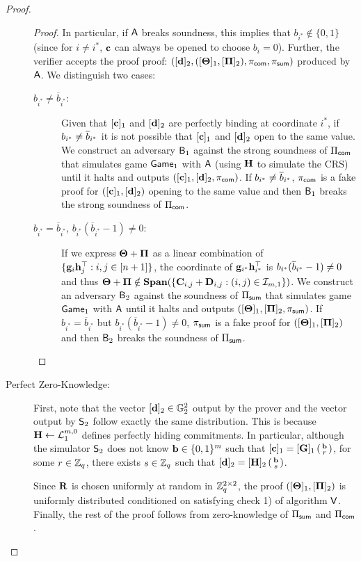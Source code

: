 \begin{proof}
\begin{description}
\begin{proof}
In particular, if $\mathsf{A}$ breaks soundness, this implies that $b_{i^*} \notin \{0,1\}$ (since for $i\neq i^*$, 
$\mathbf{c}$ can always be opened to 
  choose $b_i=0$). Further, the verifier accepts the proof proof:
$ (
        [\mathbf{d}]_2,
        ([\mathbf{{\Theta}}]_1, [\mathbf{{\Pi}}]_2), 
        \pi_{\mathsf{com}},\pi_{\mathsf{sum}} )$
  produced by $\mathsf{A}$.
We distinguish two cases:
\begin{description}
\item[$b_{i^*} \neq \overline{b}_{i^*}$:] Given that $[\mathbf{c}]_1$ and $[\mathbf{d}]_2$ are perfectly binding at coordinate $i^*$, if $b_{i^*}\neq\overline{b}_{i^*}$ it is not possible that $[\mathbf{c}]_1$ and $[\mathbf{d}]_2$ open to the same value. We construct an adversary $\mathsf{B}_1$ against the strong soundness 
of $\Pi_{\mathsf{com}}$ that simulates game $\mathsf{Game}_1$ with $\mathsf{A}$ (using $\mathbf{{H}}$ to simulate the CRS) until it halts and outputs $([\mathbf{c}]_1,[\mathbf{d}]_2,\pi_{\mathsf{com}})$. If $b_{i^*}\neq\overline{b}_{i^*}$, $\pi_{\mathsf{com}}$ is a fake proof for $([\mathbf{c}]_1,[\mathbf{d}]_2)$ opening to the same value and then $\mathsf{B}_1$ breaks the strong soundness of $\Pi_{\mathsf{com}}$.
\item[$b_{i^*} = \overline{b}_{i^*}$, 
$b_{i^*}(\overline{b}_{i^*} -1) \neq 0$:]
If we express $\mathbf{{\Theta}}+\mathbf{{\Pi}}$
as a linear combination of $\{\mathbf{g}_{i}\mathbf{h}_{j}^{\top}:i,j\in[n+1]\}$, the coordinate of
$\mathbf{g}_{i^*}\mathbf{h}_{i^*}^\top$ is $b_{i^*}(\overline{b}_{i^*}-1)\neq 0$ and thus $\mathbf{{\Theta}}+\mathbf{{\Pi}}\notin\mathbf{Span}(\{\mathbf{{C}}_{i,j}+\mathbf{{D}}_{i,j}:(i,j)\in\mathcal{I}_{m,1}\})$. We construct an adversary $\mathsf{B}_2$ against the soundness of $\Pi_{\mathsf{sum}}$ that simulates game $\mathsf{Game}_1$ with $\mathsf{A}$ until it halts and outputs $([\mathbf{{\Theta}}]_1,[\mathbf{{\Pi}}]_2,\pi_{\mathsf{sum}})$. If $b_{i^*} = \overline{b}_{i^*}$ but $b_{i^*}(\overline{b}_{i^*} -1) \neq 0$, $\pi_{\mathsf{sum}}$ is a fake proof for $([\mathbf{{\Theta}}]_1,[\mathbf{{\Pi}}]_2)$ and then $\mathsf{B}_2$ breaks the soundness of $\Pi_{\mathsf{sum}}$.
\end{description}
\end{proof}

\item[Perfect Zero-Knowledge:] First, note that the vector $[\mathbf{d}]_2 \in \mathbb{G}_2^2$ output by the prover and the vector output by $\mathsf{S}_2$ follow exactly the same distribution. This is because $\mathbf{{H}}\gets\mathcal{L}_1^{m,0}$ defines perfectly hiding commitments. In particular, although the simulator $\mathsf{S}_2$ does not know $\mathbf{b} \in \{0,1\}^{m}$ such that $[\mathbf{c}]_1=[\mathbf{{G}}]_1\left(\begin{smallmatrix}\mathbf{b}\\r\end{smallmatrix}\right)$, for some $r\in\mathbb{Z}_q$, 
there exists $s \in \mathbb{Z}_q$ such that $[\mathbf{d}]_2=[\mathbf{{H}}]_2\left(\begin{smallmatrix}\mathbf{b}\\ s\end{smallmatrix}\right)$. 

Since $\mathbf{{R}}$ is chosen uniformly at random in $\mathbb{Z}_q^{2 \times 2}$, the proof $([\mathbf{{\Theta}}]_1, [\mathbf{{\Pi}}]_2)$ is uniformly distributed conditioned on satisfying check 1) of algorithm $\mathsf{V}$.
 Finally, the rest of the proof follows from zero-knowledge of $\Pi_{\mathsf{sum}}$ and $\Pi_{\mathsf{com}}$.
\end{description}
\end{proof}

